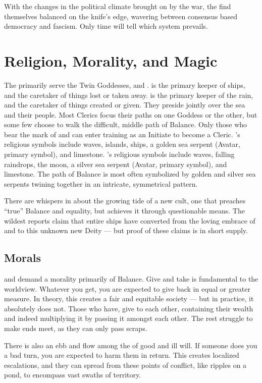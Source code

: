 \documentclass[blue]{GL2020}
\begin{document}
With the changes in the political climate brought on by the war, the \pShippies{} find themselves balanced on the knife's edge, wavering between consensus based democracy and fascism. Only time will tell which system prevails.

\section*{Religion, Morality, and Magic}
The \pShippies{} primarily serve the Twin Goddesses, \cEbb{} and \cFlow{}. \cEbbFull{\MYname} is the primary keeper of ships, and the caretaker of things lost or taken away. \cFlowFull{\MYname} is the primary keeper of the rain, and the caretaker of things created or given. They preside jointly over the sea and their people. Most Clerics focus their paths on one Goddess or the other, but some few choose to walk the difficult, middle path of Balance. Only those who bear the mark of \cEbb{} and \cFlow{} can enter training as an Initiate to become a Cleric. \cEbb{}’s religious symbols include waves, islands, ships, a golden sea serpent (Avatar, primary symbol), and limestone. \cFlow{}’s religious symbols include waves, falling raindrops, the moon, a silver sea serpent (Avatar, primary symbol), and limestone. The path of Balance is most often symbolized by golden and silver sea serpents twining together in an intricate, symmetrical pattern.

There are whispers in \pShip{} about the growing tide of a new cult, one that preaches ``true'' Balance and equality, but achieves it through questionable means. The wildest reports claim that entire ships have converted from the loving embrace of \cEbb{} and \cFlow{} to this unknown new Deity — but proof of these claims is in short supply.

\subsection*{Morals}
\cEbb{} and \cFlow{} demand a morality primarily of Balance. Give and take is fundamental to the \pShip{} worldview. Whatever you get, you are expected to give back in equal or greater measure. In theory, this creates a fair and equitable society — but in practice, it absolutely does not. Those who have, give to each other, containing their wealth and indeed multiplying it by passing it amongst each other. The rest struggle to make ends meet, as they can only pass scraps.

There is also an ebb and flow among the \pShippies{} of good and ill will. If someone does you a bad turn, you are expected to harm them in return. This creates localized escalations, and they can spread from these points of conflict, like ripples on a pond, to encompass vast swaths of \pShip{} territory.
\end{document}
